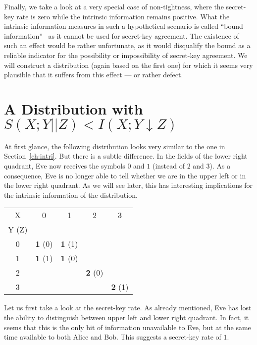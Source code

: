 \documentclass[a4paper, twoside, openany]{report}
\newcommand{\intrivar}[3]{I(#1;#2\!\!\downarrow\!#3)}
\newcommand{\intri}{\intrivar{X}{Y}{Z}}
\newcommand{\srate}{S(X;Y||Z)}
\newcommand{\p}[1]{\textbf{#1}}
\theoremstyle{plain}
\theoremstyle{definition}
\begin{document}
Finally, we take a look at a very special case of non-tightness, where the secret-key rate is zero while the intrinsic information remains positive. What the intrinsic information measures in such a hypothetical scenario is called ``bound information''~\cite{grw00} as it cannot be used for secret-key agreement. The existence of such an effect would be rather unfortunate, as it would disqualify the bound as a reliable indicator for the possibility or impossibility of secret-key agreement. We will construct a distribution (again based on the first one) for which it seems very plausible that it suffers from this effect --- or rather defect.


\section{A Distribution with $\srate < \intri$}

At first glance, the following distribution looks very similar to the one in Section~\ref{ch:intri}. But there is a subtle difference. In the fields of the lower right quadrant, Eve now receives the symbols $0$ and $1$ (instead of $2$ and $3$). As a consequence, Eve is no longer able to tell whether we are in the upper left or in the lower right quadrant. As we will see later, this has interesting implications for the intrinsic information of the distribution. 

\begin{center}
\begin{tabular}{|c||c|c|c|c|}
\hline
X     &     0     &     1     &     2     &     3     \\
Y (Z) &           &           &           &           \\
\hline\hline
0     & \p{1} (0) & \p{1} (1) &           &           \\
\hline
1     & \p{1} (1) & \p{1} (0) &           &           \\
\hline
2     &           &           & \p{2} (0) &           \\
\hline
3     &           &           &           & \p{2} (1) \\
\hline
\end{tabular}
\end{center}

Let us first take a look at the secret-key rate. As already mentioned, Eve has lost the ability to distinguish between upper left and lower right quadrant. In fact, it seems that this is the only bit of information unavailable to Eve, but at the same time available to both Alice and Bob. This suggests a secret-key rate of $1$.
\end{document}

